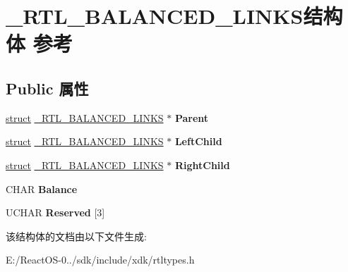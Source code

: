 \hypertarget{struct___r_t_l___b_a_l_a_n_c_e_d___l_i_n_k_s}{}\section{\+\_\+\+R\+T\+L\+\_\+\+B\+A\+L\+A\+N\+C\+E\+D\+\_\+\+L\+I\+N\+K\+S结构体 参考}
\label{struct___r_t_l___b_a_l_a_n_c_e_d___l_i_n_k_s}
\subsection*{Public 属性}
\begin{DoxyCompactItemize}
\item 
\mbox{\label{struct___r_t_l___b_a_l_a_n_c_e_d___l_i_n_k_s_abfa95f44c784986c89f8e1c78ec9588e}} 
\hyperlink{interfacestruct}{struct} \hyperlink{struct___r_t_l___b_a_l_a_n_c_e_d___l_i_n_k_s}{\+\_\+\+R\+T\+L\+\_\+\+B\+A\+L\+A\+N\+C\+E\+D\+\_\+\+L\+I\+N\+KS} $\ast$ {\bfseries Parent}
\item 
\mbox{\label{struct___r_t_l___b_a_l_a_n_c_e_d___l_i_n_k_s_aa00bae942207125d0ea35a9a24ddd399}} 
\hyperlink{interfacestruct}{struct} \hyperlink{struct___r_t_l___b_a_l_a_n_c_e_d___l_i_n_k_s}{\+\_\+\+R\+T\+L\+\_\+\+B\+A\+L\+A\+N\+C\+E\+D\+\_\+\+L\+I\+N\+KS} $\ast$ {\bfseries Left\+Child}
\item 
\mbox{\label{struct___r_t_l___b_a_l_a_n_c_e_d___l_i_n_k_s_a737f2ea07f24290c45dddcfe6cc4b747}} 
\hyperlink{interfacestruct}{struct} \hyperlink{struct___r_t_l___b_a_l_a_n_c_e_d___l_i_n_k_s}{\+\_\+\+R\+T\+L\+\_\+\+B\+A\+L\+A\+N\+C\+E\+D\+\_\+\+L\+I\+N\+KS} $\ast$ {\bfseries Right\+Child}
\item 
\mbox{\label{struct___r_t_l___b_a_l_a_n_c_e_d___l_i_n_k_s_a71f22e6c546c5eabd0ba5ccfeaec6982}} 
C\+H\+AR {\bfseries Balance}
\item 
\mbox{\label{struct___r_t_l___b_a_l_a_n_c_e_d___l_i_n_k_s_a883f3e901ad4f40a2b6043686404a726}} 
U\+C\+H\+AR {\bfseries Reserved} \mbox{[}3\mbox{]}
\end{DoxyCompactItemize}


该结构体的文档由以下文件生成\+:\begin{DoxyCompactItemize}
\item 
E\+:/\+React\+O\+S-\/0../sdk/include/xdk/rtltypes.\+h\end{DoxyCompactItemize}
